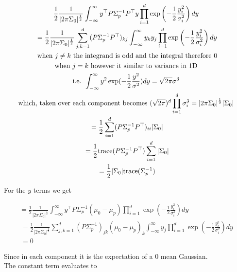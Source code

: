 \documentclass{article}
\begin{document}
\begin{gather}
    \frac{1}{2}\frac{1}{|2\pi\Sigma_0|^{\frac{1}{2}}} \int_{-\infty}^{\infty} y^{\top}P \Sigma^{-1}_p P^{\top} y 
    \prod_{i=1}^d \exp \left( - \frac{1}{2} \frac{y_i^2}{\sigma_i^2} \right)dy \\
    \
    = \frac{1}{2}\frac{1}{|2\pi\Sigma_0|^{\frac{1}{2}}}  \sum_{j,k=1}^{d} 
    (P\Sigma_p^{-1} P^{\top})_{kj} \int_{-\infty}^{\infty} y_k  y_j
    \prod_{i=1}^d \exp \left( - \frac{1}{2} \frac{y_i^2}{\sigma_i^2} \right)dy \\
    \
    \textrm{when $j \neq k$ the integrand is odd and the integral therefore 0}\\
    \textrm{when $j = k$ however it similar to variance in 1D} \\
    \textrm{i.e. } \int_{-\infty}^{\infty} y^2 \exp(- \frac{1}{2} \frac{y^2}{\sigma^2} ) dy = \sqrt{2 \pi} \sigma^3 \\
    \textrm{which, taken over each component becomes } 
    (\sqrt{2\pi})^d \prod_{i=1}^d \sigma_i^3 = |2\pi\Sigma_0|^{\frac{1}{2}} |\Sigma_0| \\
    \
    = \frac{1}{2} \sum_{i=1}^{d} (P\Sigma_p^{-1} P^{\top})_{ii} |\Sigma_0| \\
    \
    = \frac{1}{2} \textrm{trace}(P\Sigma_p^{-1} P^{\top}) \sum_{i=1}^{d} |\Sigma_0|  \\
    \
    = \frac{1}{2}|\Sigma_0| \textrm{trace}( \Sigma_p^{-1} )
\end{gather}

For the $y$ terms we get

\begin{gather}
    = \frac{1}{2}\frac{1}{|{2\pi}\Sigma_0|^{\frac{1}{2}}} \int_{-\infty}^{\infty} 
    y^{\top}P \Sigma^{-1}_p (\mu_0-\mu_p) 
    \prod_{i=1}^d \exp \left( - \frac{1}{2} \frac{y_i^2}{\sigma_i^2} \right)dy \\
    \
    = \frac{1}{2}\frac{1}{|{2\pi}\Sigma_0|^{\frac{1}{2}}} 
    \sum_{j,k=1}^{d} (P \Sigma^{-1}_p)_{jk} (\mu_0-\mu_p)_k \int_{-\infty}^{\infty} y_j 
    \prod_{i=1}^d \exp \left( - \frac{1}{2} \frac{y_i^2}{\sigma_i^2} \right)dy \\
    \
    = 0
\end{gather}

Since in each component it is the expectation of a 0 mean Gaussian.\\
The constant term evaluates to
\end{document}
